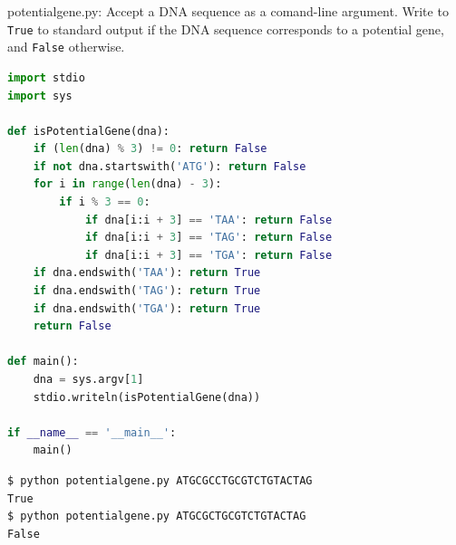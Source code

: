 \documentclass[8pt,a4paper,compress,handout]{beamer}
\begin{document}
\begin{frame}[fragile]
\begin{framed}
\tiny potentialgene.py: Accept a DNA sequence as a comand-line argument. Write to \lstinline{True} to standard output if the DNA sequence corresponds to a potential gene, and \lstinline{False} otherwise.
\end{framed}

\begin{lstlisting}[language=Python]
import stdio
import sys

def isPotentialGene(dna):
    if (len(dna) % 3) != 0: return False
    if not dna.startswith('ATG'): return False
    for i in range(len(dna) - 3):
        if i % 3 == 0:
            if dna[i:i + 3] == 'TAA': return False
            if dna[i:i + 3] == 'TAG': return False
            if dna[i:i + 3] == 'TGA': return False
    if dna.endswith('TAA'): return True
    if dna.endswith('TAG'): return True
    if dna.endswith('TGA'): return True
    return False

def main():
    dna = sys.argv[1]
    stdio.writeln(isPotentialGene(dna))

if __name__ == '__main__':
    main()
\end{lstlisting}

\begin{lstlisting}[language={}]
$ python potentialgene.py ATGCGCCTGCGTCTGTACTAG
True
$ python potentialgene.py ATGCGCTGCGTCTGTACTAG
False
\end{lstlisting}
\end{frame}
\end{document}
